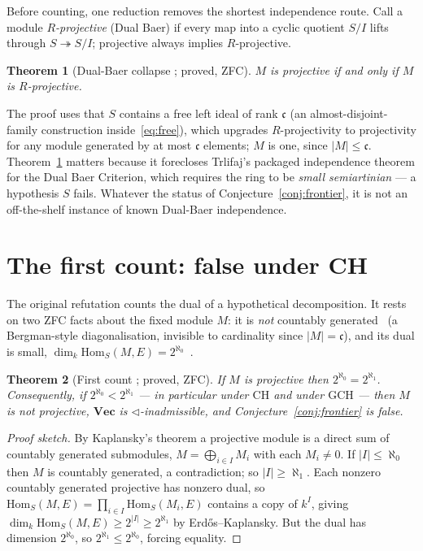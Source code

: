 \documentclass[11pt]{report}
\theoremstyle{plain}
\newtheorem{theorem}{Theorem}[chapter]
\theoremstyle{definition}
\theoremstyle{remark}
\newcommand{\VecC}{\mathbf{Vec}}
\newcommand{\cont}{\mathfrak{c}}
\newcommand{\Hom}{\mathrm{Hom}}
\newcommand{\tri}{\triangleleft}
\begin{document}
Before counting, one reduction removes the shortest independence route. Call a
module \emph{$R$-projective} (Dual Baer) if every map into a cyclic quotient
$S/I$ lifts through $S\twoheadrightarrow S/I$; projective always implies
$R$-projective.

\begin{theorem}[Dual-Baer collapse {\cite{macbeth-trlifaj}}; proved, ZFC]
\label{thm:frontier-dbc}
$M$ is projective if and only if $M$ is $R$-projective.
\end{theorem}

The proof uses that $S$ contains a free left ideal of rank $\cont$ (an
almost-disjoint-family construction inside~\eqref{eq:free}), which upgrades
$R$-projectivity to projectivity for any module generated by at most $\cont$
elements; $M$ is one, since $|M|\le\cont$. Theorem~\ref{thm:frontier-dbc}
matters because it forecloses Trlifaj's packaged independence theorem for the
Dual Baer Criterion, which requires the ring to be \emph{small semiartinian} ---
a hypothesis $S$ fails. Whatever the status of Conjecture~\ref{conj:frontier},
it is not an off-the-shelf instance of known Dual-Baer independence.

\section{The first count: false under CH}\label{sec:frontier-count}

The original refutation counts the dual of a hypothetical decomposition. It
rests on two ZFC facts about the fixed module $M$: it is \emph{not} countably
generated~\cite[\S5]{macbeth-reduction} (a Bergman-style diagonalisation, invisible
to cardinality since $|M|=\cont$), and its dual is small, $\dim_k\Hom_S(M,E)=2^{\aleph_0}$~\cite[Thm.~F]{macbeth-reduction}.

\begin{theorem}[First count {\cite{macbeth-ch}}; proved, ZFC]
\label{thm:frontier-firstcount}
If $M$ is projective then $2^{\aleph_0}=2^{\aleph_1}$. Consequently, if
$2^{\aleph_0}<2^{\aleph_1}$ --- in particular under $\mathrm{CH}$ and under
$\mathrm{GCH}$ --- then $M$ is not projective, $\VecC$ is $\tri$-inadmissible,
and Conjecture~\ref{conj:frontier} is false.
\end{theorem}

\begin{proof}[Proof sketch]
By Kaplansky's theorem a projective module is a direct sum of countably
generated submodules, $M=\bigoplus_{i\in I}M_i$ with each $M_i\ne0$. If
$|I|\le\aleph_0$ then $M$ is countably generated, a contradiction; so
$|I|\ge\aleph_1$. Each nonzero countably generated projective has nonzero dual,
so
$\Hom_S(M,E)=\prod_{i\in I}\Hom_S(M_i,E)$ contains a copy of $k^{I}$, giving
$\dim_k\Hom_S(M,E)\ge 2^{|I|}\ge2^{\aleph_1}$ by Erd\H{o}s--Kaplansky. But the
dual has dimension $2^{\aleph_0}$, so $2^{\aleph_1}\le 2^{\aleph_0}$, forcing
equality.
\end{proof}
\end{document}
